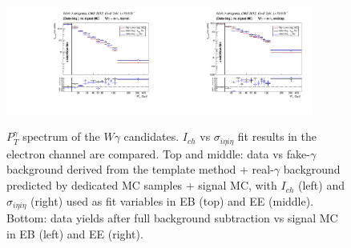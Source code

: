 \begin{figure}[htb]
\begin{center}
\includegraphics[width=0.45\textwidth]{../figs/figs_v11/ELECTRON_WGamma/PrepareYields/c_BkgSubtrDATAvsSIGMC_c_ELECTRON_WGamma__UNblind__Barrel__phoEt.pdf}\includegraphics[width=0.45\textwidth]{../figs/figs_v11/ELECTRON_WGamma/PrepareYields/c_BkgSubtrDATAvsSIGMC_c_ELECTRON_WGamma__UNblind__Endcap__phoEt.pdf}\\
  \caption{$P_T^{\gamma}$ spectrum of the $W\gamma$ candidates. $I_{ch}$ vs $\sigma_{i\eta i\eta}$ fit results in the electron channel are compared. Top and middle: data vs fake-$\gamma$ background derived from the template method + real-$\gamma$ background predicted by dedicated MC samples + signal MC, with $I_{ch}$ (left) and $\sigma_{i\eta i\eta}$ (right) used as fit variables in EB (top) and EE (middle). Bottom: data yields after full background subtraction vs signal MC in EB (left) and EE (right).}
  \label{fig:DDvsMC_Wg_Data_ELECTRON}
  \end{center}
\end{figure}

\clearpage

